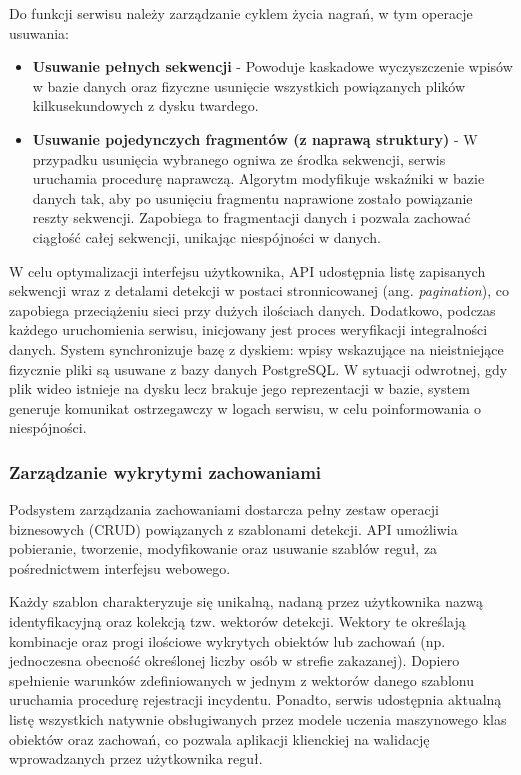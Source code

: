 Do funkcji serwisu należy zarządzanie cyklem życia nagrań, w tym operacje usuwania:
\begin{itemize}
    \item \textbf{Usuwanie pełnych sekwencji} - Powoduje kaskadowe wyczyszczenie wpisów w bazie danych oraz fizyczne usunięcie wszystkich powiązanych plików kilkusekundowych z dysku twardego.
    \item \textbf{Usuwanie pojedynczych fragmentów (z naprawą struktury)} - W przypadku usunięcia wybranego ogniwa ze środka sekwencji, serwis uruchamia procedurę naprawczą. Algorytm modyfikuje wskaźniki w bazie danych tak, aby po usunięciu fragmentu naprawione zostało powiązanie reszty sekwencji. Zapobiega to fragmentacji danych i pozwala zachować ciągłość całej sekwencji, unikając niespójności w danych.
\end{itemize}

W celu optymalizacji interfejsu użytkownika, API udostępnia listę zapisanych sekwencji wraz z detalami detekcji w postaci stronnicowanej (ang. \textit{pagination}), co zapobiega przeciążeniu sieci przy dużych ilościach danych. Dodatkowo, podczas każdego uruchomienia serwisu, inicjowany jest proces weryfikacji integralności danych. System synchronizuje bazę z dyskiem: wpisy wskazujące na nieistniejące fizycznie pliki są usuwane z bazy danych PostgreSQL. W sytuacji odwrotnej, gdy plik wideo istnieje na dysku lecz brakuje jego reprezentacji w bazie, system generuje komunikat ostrzegawczy w logach serwisu, w celu poinformowania o niespójności.
\subsubsection{Zarządzanie wykrytymi zachowaniami}
Podsystem zarządzania zachowaniami dostarcza pełny zestaw operacji biznesowych (CRUD) powiązanych z szablonami detekcji. API umożliwia pobieranie, tworzenie, modyfikowanie oraz usuwanie szablów reguł, za pośrednictwem interfejsu webowego. 

Każdy szablon charakteryzuje się unikalną, nadaną przez użytkownika nazwą identyfikacyjną oraz kolekcją tzw. wektorów detekcji. Wektory te określają kombinacje oraz progi ilościowe wykrytych obiektów lub zachowań (np. jednoczesna obecność określonej liczby osób w strefie zakazanej). Dopiero spełnienie warunków zdefiniowanych w jednym z wektorów danego szablonu uruchamia procedurę rejestracji incydentu. Ponadto, serwis udostępnia aktualną listę wszystkich natywnie obsługiwanych przez modele uczenia maszynowego klas obiektów oraz zachowań, co pozwala aplikacji klienckiej na walidację wprowadzanych przez użytkownika reguł.

